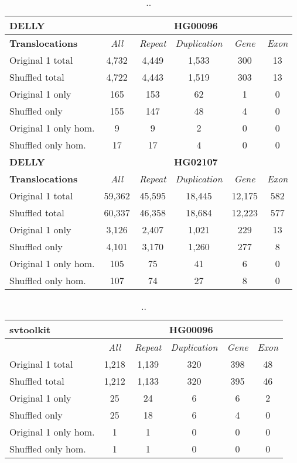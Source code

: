 \begin{table}[htb]
\caption{ .. }
\begin{center}
\begin{tabular}{|l|c||c|c|c|c|}
\hline
{\bf DELLY} & \multicolumn{5}{|c|}{\bf HG00096} \\
\hline
\cline{2-6}
{\bf Translocations} & {\it All} & {\it Repeat} & {\it Duplication} & {\it Gene} & {\it Exon} \\
\hline
Original 1 total & 4,732 & 4,449 & 1,533 & 300 & 13\\ 
\hline
Shuffled total & 4,722 & 4,443 & 1,519 & 303 & 13\\ 
\hline
Original 1 only & 165 & 153 & 62 & 1 & 0\\ 
\hline
Shuffled only & 155 & 147 & 48 & 4 & 0\\ 
\hline
Original 1 only hom. & 9 & 9 & 2 & 0 & 0\\ 
\hline
Shuffled only hom. & 17 & 17 & 4 & 0 & 0\\ 
\hline
\hline
{\bf DELLY} & \multicolumn{5}{|c|}{\bf HG02107} \\
\hline
\cline{2-6}
{\bf Translocations} & {\it All} & {\it Repeat} & {\it Duplication} & {\it Gene} & {\it Exon} \\
\hline
Original 1 total & 59,362 & 45,595 & 18,445 & 12,175 & 582\\ 
\hline
Shuffled total & 60,337 & 46,358 & 18,684 & 12,223 & 577\\ 
\hline
Original 1 only & 3,126 & 2,407 & 1,021 & 229 & 13\\ 
\hline
Shuffled only & 4,101 & 3,170 & 1,260 & 277 & 8\\ 
\hline
Original 1 only hom. & 105 & 75 & 41 & 6 & 0\\ 
\hline
Shuffled only hom. & 107 & 74 & 27 & 8 & 0\\ 
\hline
\end{tabular}
\end{center}
\label{tab:orig-vs-shuf-delly-trans}
\end{table}

\begin{table}[htb]
\caption{ .. }
\begin{center}
\begin{tabular}{|l|c||c|c|c|c|}
\hline
{\bf svtoolkit} & \multicolumn{5}{|c|}{\bf HG00096} \\
\hline
\cline{2-6}
{\bf} & {\it All} & {\it Repeat} & {\it Duplication} & {\it Gene} & {\it Exon} \\
\hline
Original 1 total & 1,218 & 1,139 & 320 & 398 & 48 \\
\hline
Shuffled total & 1,212 & 1,133 & 320 & 395 & 46 \\
\hline
Original 1 only & 25 & 24 & 6 & 6 & 2\\ 
\hline
Shuffled only & 25 & 18 & 6 & 4 & 0\\
\hline
Original 1 only hom. & 1 & 1 & 0 & 0 & 0\\ 
\hline
Shuffled only hom. & 1 & 1 & 0 & 0 & 0\\  
\hline
\end{tabular}
\end{center}
\label{tab:orig-vs-shuf-svtoolkit}
\end{table}

